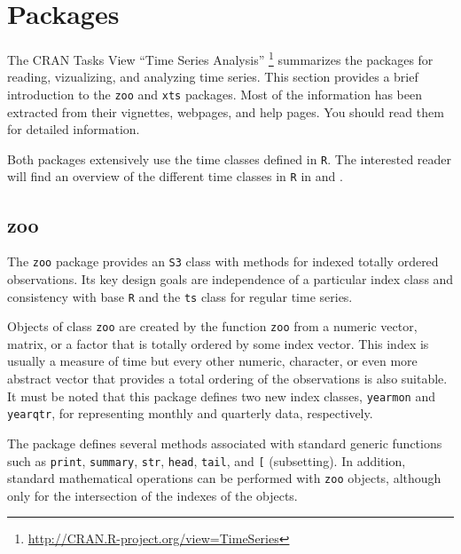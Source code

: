 \documentclass[smallroyalvopaper]{memoir}
\begin{document}
\section{Packages}
\label{sec:orgc30a2d7}
\label{sec:time-series-packages}

The CRAN Tasks View ``Time Series Analysis'' \footnote{\url{http://CRAN.R-project.org/view=TimeSeries}} summarizes the packages for reading, vizualizing, and analyzing time series. This section provides a brief introduction to the \texttt{zoo} and \texttt{xts} packages. Most of the information has been extracted from their vignettes, webpages, and help pages. You should read them for detailed information.

Both packages extensively use the time classes defined in \texttt{R}. The interested reader will find an overview of the different time classes in \texttt{R} in \cite{Ripley.Hornik2001} and \cite{Grothendieck.Petzoldt2004}.

\subsection{zoo}
\label{sec:org6d78729}
\label{sec:zoo}

The \texttt{zoo} package \cite{Zeileis.Grothendieck2005} provides an \texttt{S3} class with methods for indexed totally ordered observations. Its key design goals are independence of a particular index class and consistency with base \texttt{R} and the \texttt{ts} class for regular time series.


Objects of class \texttt{zoo} are created by the function \texttt{zoo} from a numeric vector, matrix, or a factor that is totally ordered by some index vector. This index is usually a measure of time but every other numeric, character, or even more abstract vector that provides a total ordering of the observations is also suitable. It must be noted that this package defines two new index classes, \texttt{yearmon} and \texttt{yearqtr}, for representing monthly and quarterly data, respectively.

The package defines several methods associated with standard generic functions such as \texttt{print}, \texttt{summary}, \texttt{str}, \texttt{head}, \texttt{tail}, and \texttt{[} (subsetting). In addition, standard mathematical operations can be performed with \texttt{zoo} objects, although only for the intersection of the indexes of the objects.
\end{document}

